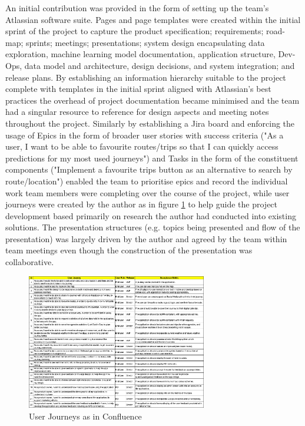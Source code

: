 \documentclass[]{UCD_CS_47360_Report}
\begin{document}
 An initial contribution was provided in the form of setting up the team's Atlassian software suite. Pages and page templates were created within the initial sprint of the project to capture the product specification; requirements; road-map; sprints; meetings; presentations; system design encapsulating data exploration, machine learning model documentation, application structure, Dev-Ops, data model and architecture, design decisions, and system integration; and release plans. By establishing an information hierarchy suitable to the project complete with templates in the initial sprint aligned with Atlassian's best practices \cite{Confluence-BP} the overhead of project documentation became minimised and the team had a singular resource to reference for design aspects and meeting notes throughout the project. Similarly by establishing a Jira board and enforcing the usage of Epics in the form of broader user stories with success criteria ("As a user, I want to be able to favourite routes/trips so that I can quickly access predictions for my most used journeys") and Tasks in the form of the constituent components ("Implement a favourite trips button as an alternative to search by route/location") enabled the team to prioritise epics and record the individual work team members were completing over the course of the project, while user journeys were created by the author as in figure \ref{fig:ProdReq} to help guide the project development based primarily on research the author had conducted into existing solutions. The presentation structures (e.g. topics being presented and flow of the presentation) was largely driven by the author and agreed by the team within team meetings even though the construction of the presentation was collaborative.
 
 
\begin{figure}[!htb]
    \centering
    \includegraphics[width=0.7\textwidth]{figures/ProductRequirements.png}
    \caption{User Journeys as in Confluence}
    \label{fig:ProdReq}
\end{figure}
\end{document}
